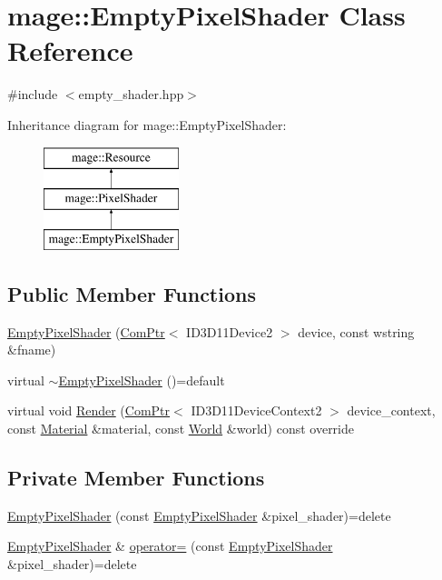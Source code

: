 \hypertarget{classmage_1_1_empty_pixel_shader}{}\section{mage\+:\+:Empty\+Pixel\+Shader Class Reference}
\label{classmage_1_1_empty_pixel_shader}


{\ttfamily \#include $<$empty\+\_\+shader.\+hpp$>$}

Inheritance diagram for mage\+:\+:Empty\+Pixel\+Shader\+:\begin{figure}[H]
\begin{center}
\leavevmode
\includegraphics[height=3.000000cm]{classmage_1_1_empty_pixel_shader}
\end{center}
\end{figure}
\subsection*{Public Member Functions}
\begin{DoxyCompactItemize}
\item 
\hyperlink{classmage_1_1_empty_pixel_shader_a261460a727f3cc27f16ac6b746d1b4a2}{Empty\+Pixel\+Shader} (\hyperlink{namespacemage_ae74f374780900893caa5555d1031fd79}{Com\+Ptr}$<$ I\+D3\+D11\+Device2 $>$ device, const wstring \&fname)
\item 
virtual \hyperlink{classmage_1_1_empty_pixel_shader_ace5053e12d6fa60caa2bcca00d192fab}{$\sim$\+Empty\+Pixel\+Shader} ()=default
\item 
virtual void \hyperlink{classmage_1_1_empty_pixel_shader_a492a634cc8ef167f92c63f8d863e8e6b}{Render} (\hyperlink{namespacemage_ae74f374780900893caa5555d1031fd79}{Com\+Ptr}$<$ I\+D3\+D11\+Device\+Context2 $>$ device\+\_\+context, const \hyperlink{structmage_1_1_material}{Material} \&material, const \hyperlink{classmage_1_1_world}{World} \&world) const override
\end{DoxyCompactItemize}
\subsection*{Private Member Functions}
\begin{DoxyCompactItemize}
\item 
\hyperlink{classmage_1_1_empty_pixel_shader_a5eaa8370d531fcc7877cc706bc8fbcce}{Empty\+Pixel\+Shader} (const \hyperlink{classmage_1_1_empty_pixel_shader}{Empty\+Pixel\+Shader} \&pixel\+\_\+shader)=delete
\item 
\hyperlink{classmage_1_1_empty_pixel_shader}{Empty\+Pixel\+Shader} \& \hyperlink{classmage_1_1_empty_pixel_shader_a7702fdae1d752ed422d1508e6ee08479}{operator=} (const \hyperlink{classmage_1_1_empty_pixel_shader}{Empty\+Pixel\+Shader} \&pixel\+\_\+shader)=delete
\end{DoxyCompactItemize}
